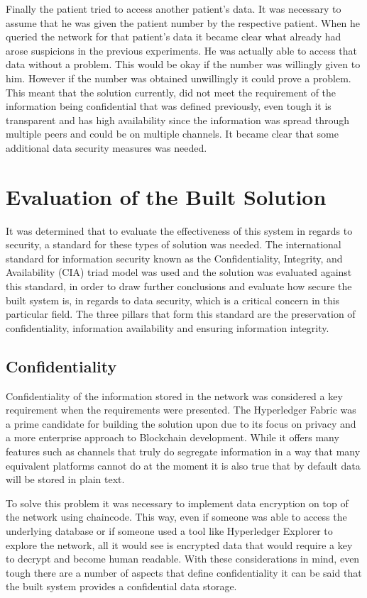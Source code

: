Finally the patient tried to access another patient's data. It was necessary to
assume that he was given the patient number by the respective patient. When he
queried the network for that patient's data it became clear what already had
arose suspicions in the previous experiments. He was actually able to access
that data without a problem. This would be okay if the number was willingly
given to him. However if the number was obtained unwillingly it could prove a
problem. This meant that the solution currently, did not meet the requirement
of the information being confidential that was defined previously, even tough
it is transparent and has high availability since the information was spread
through multiple peers and could be on multiple channels. It became clear that
some additional data security measures was needed.

\section{Evaluation of the Built Solution}

It was determined that to evaluate the effectiveness of this system in regards
to security, a standard for these types of solution was needed. The
international standard for information security known as the Confidentiality,
Integrity, and Availability (CIA) triad model was used and the solution was
evaluated against this standard, in order to draw further conclusions and
evaluate how secure the built system is, in regards to data security, which is
a critical concern in this particular field. The three pillars that form this
standard are the preservation of confidentiality, information availability and
ensuring information integrity.

\subsection{Confidentiality}

Confidentiality of the information stored in the network was considered a key
requirement when the requirements were presented. The Hyperledger Fabric was a
prime candidate for building the solution upon due to its focus on privacy and
a more enterprise approach to Blockchain development. While it offers many
features such as channels that truly do segregate information in a way that
many equivalent platforms cannot do at the moment it is also true that by
default data will be stored in plain text. 

To solve this problem it was necessary to implement data encryption on top of
the network using chaincode. This way, even if someone was able to access the
underlying database or if someone used a tool like Hyperledger Explorer to
explore the network, all it would see is encrypted data that would require a
key to decrypt and become human readable. With these considerations in mind,
even tough there are a number of aspects that define confidentiality it can be
said that the built system provides a confidential data storage.

